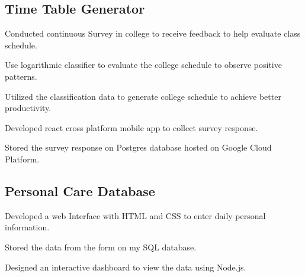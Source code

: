 \documentclass[letter,10pt]{article}
\begin{document}
\subsection{{Time Table Generator}}
\begin{zitemize}
\item Conducted continuous Survey in college to receive feedback to help evaluate class schedule.
\item Use logarithmic classifier to evaluate the college schedule to observe positive patterns.
\item Utilized the classification data to generate college schedule to achieve better productivity.
\item Developed react cross platform mobile app to collect survey response.
\item Stored the survey response on Postgres database hosted on Google Cloud Platform.
\end{zitemize}


\subsection{{Personal Care Database}}
\begin{zitemize}
\item Developed a web Interface with HTML and CSS to enter daily personal information.
\item Stored the data from the form on my SQL database.
\item Designed an interactive dashboard to view the data using Node.js.
\end{zitemize}
\end{document}
